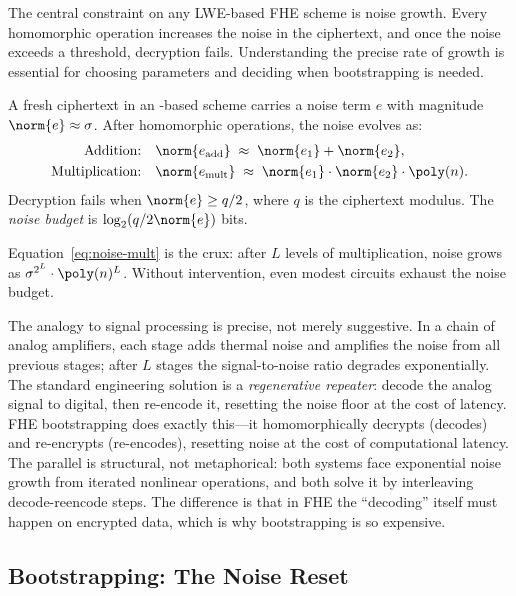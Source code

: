 The central constraint on any LWE-based FHE scheme is noise growth.  Every homomorphic operation increases the noise in the ciphertext, and once the noise exceeds a threshold, decryption fails.  Understanding the precise rate of growth is essential for choosing parameters and deciding when bootstrapping is needed.

\begin{definition}
\label{def:noise-budget}
A fresh ciphertext in an \lwe{}-based scheme carries a noise term $e$ with magnitude $\norm{e} \approx \sigma$.  After homomorphic operations, the noise evolves as:
\begin{align}
\text{Addition:}\quad & \norm{e_{\mathrm{add}}} \;\approx\; \norm{e_1} + \norm{e_2}, \label{eq:noise-add}\\
\text{Multiplication:}\quad & \norm{e_{\mathrm{mult}}} \;\approx\; \norm{e_1}\cdot\norm{e_2}\cdot\poly(n). \label{eq:noise-mult}
\end{align}
Decryption fails when $\norm{e} \geq q/2$, where $q$ is the ciphertext modulus.  The \emph{noise budget} is $\log_2(q / 2\norm{e})$ bits.
\end{definition}

Equation~\eqref{eq:noise-mult} is the crux: after $L$ levels of multiplication, noise grows as $\sigma^{2^L}\cdot\poly(n)^L$.  Without intervention, even modest circuits exhaust the noise budget.

The analogy to signal processing is precise, not merely suggestive.  In a chain of analog amplifiers, each stage adds thermal noise and amplifies the noise from all previous stages; after $L$ stages the signal-to-noise ratio degrades exponentially.  The standard engineering solution is a \emph{regenerative repeater}: decode the analog signal to digital, then re-encode it, resetting the noise floor at the cost of latency.  FHE bootstrapping does exactly this---it homomorphically decrypts (decodes) and re-encrypts (re-encodes), resetting noise at the cost of computational latency.  The parallel is structural, not metaphorical: both systems face exponential noise growth from iterated nonlinear operations, and both solve it by interleaving decode-reencode steps.  The difference is that in FHE the ``decoding'' itself must happen on encrypted data, which is why bootstrapping is so expensive.


\subsection{Bootstrapping: The Noise Reset}
\label{subsec:bootstrapping}

